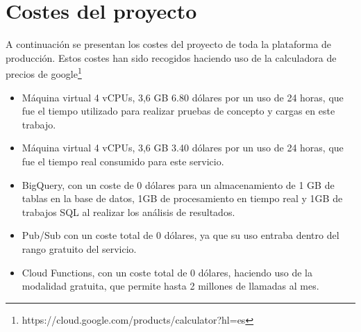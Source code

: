 \section{Costes del proyecto}\label{sec:costes-del-proyecto}
A continuación se presentan los costes del proyecto de toda la plataforma de producción.
Estos costes han sido recogidos haciendo uso de la calculadora de precios de google\footnote{https://cloud.google.com/products/calculator?hl=es}

\begin{itemize}
    \item Máquina virtual 4 vCPUs, 3,6 GB 6.80 dólares por un uso de 24 horas, que fue el tiempo utilizado para realizar pruebas de concepto y cargas en este trabajo.
    \item Máquina virtual 4 vCPUs, 3,6 GB 3.40 dólares por un uso de 24 horas, que fue el tiempo real consumido para este servicio.
    \item BigQuery, con un coste de 0 dólares para un almacenamiento de 1 GB de tablas en la base de datos, 1GB de procesamiento en tiempo real y 1GB de trabajos SQL al realizar los análisis de resultados.
    \item Pub/Sub con un coste total de 0 dólares, ya que su uso entraba dentro del rango gratuito del servicio.
    \item Cloud Functions, con un coste total de 0 dólares, haciendo uso de la modalidad gratuita, que permite hasta 2 millones de llamadas al mes.
\end{itemize}